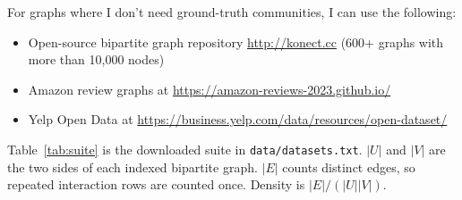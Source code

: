 \documentclass{article}
\begin{document}
For graphs where I don't need ground-truth communities, I can use the following:

\begin{itemize}
    \item Open-source bipartite graph repository \url{http://konect.cc} (600+ graphs with more than 10,000 nodes)
    \item Amazon review graphs at \url{https://amazon-reviews-2023.github.io/}
    \item Yelp Open Data at \url{https://business.yelp.com/data/resources/open-dataset/}
\end{itemize}

Table~\ref{tab:suite} is the downloaded suite in \texttt{data/datasets.txt}. $|U|$ and $|V|$ are the two sides of each indexed bipartite graph. $|E|$ counts distinct edges, so repeated interaction rows are counted once. Density is $|E|/(|U||V|)$.
\end{document}
